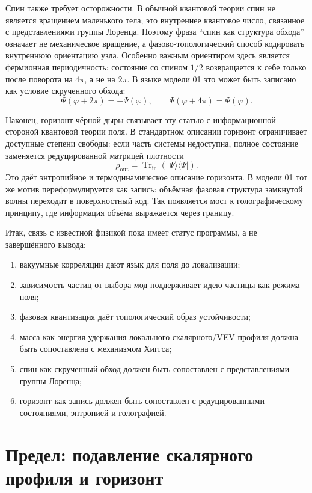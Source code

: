 \documentclass[11pt,a4paper]{article}
\newcommand{\phase}{\varphi}
\begin{document}
Спин также требует осторожности. В обычной квантовой теории спин не является вращением маленького тела; это внутреннее квантовое число, связанное с представлениями группы Лоренца. Поэтому фраза ``спин как структура обхода'' означает не механическое вращение, а фазово-топологический способ кодировать внутреннюю ориентацию узла. Особенно важным ориентиром здесь является фермионная периодичность: состояние со спином $1/2$ возвращается к себе только после поворота на $4\pi$, а не на $2\pi$. В языке модели 01 это может быть записано как условие скрученного обхода:
\begin{equation}
\Psi(\phase+2\pi)=-\Psi(\phase), \qquad \Psi(\phase+4\pi)=\Psi(\phase).
\end{equation}

Наконец, горизонт чёрной дыры связывает эту статью с информационной стороной квантовой теории поля. В стандартном описании горизонт ограничивает доступные степени свободы: если часть системы недоступна, полное состояние заменяется редуцированной матрицей плотности
\begin{equation}
\rho_{\mathrm{out}}=\operatorname{Tr}_{\mathrm{in}}\left(|\Psi\rangle\langle\Psi|\right).
\end{equation}
Это даёт энтропийное и термодинамическое описание горизонта. В модели 01 тот же мотив переформулируется как запись: объёмная фазовая структура замкнутой волны переходит в поверхностный код. Так появляется мост к голографическому принципу, где информация объёма выражается через границу.

Итак, связь с известной физикой пока имеет статус программы, а не завершённого вывода:
\begin{enumerate}
\item вакуумные корреляции дают язык для поля до локализации;
\item зависимость частиц от выбора мод поддерживает идею частицы как режима поля;
\item фазовая квантизация даёт топологический образ устойчивости;
\item масса как энергия удержания локального скалярного/VEV-профиля должна быть сопоставлена с механизмом Хиггса;
\item спин как скрученный обход должен быть сопоставлен с представлениями группы Лоренца;
\item горизонт как запись должен быть сопоставлен с редуцированными состояниями, энтропией и голографией.
\end{enumerate}

\section{Предел: подавление скалярного профиля и горизонт}
\end{document}
